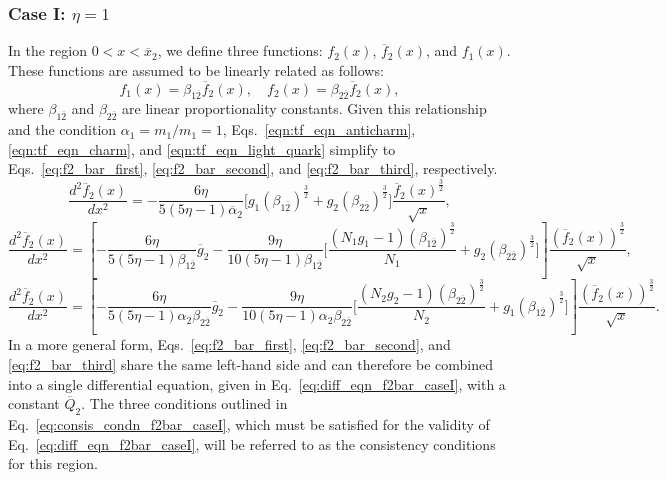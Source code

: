 \documentclass[fleqn]{article}
\begin{document}
        \subsubsection{Case I: $\eta =1$}        
            In the region $0 < x < \overline{x}_{2}$, we define three functions: $f_2(x)$, $\overline{f}_{2}(x)$, and $f_1(x)$. These functions are assumed to be linearly related as follows:  
            \[
            f_1(x) = \beta_{1\overline{2}} \overline{f}_{2}(x), \quad f_2(x) = \beta_{2\overline{2}} \overline{f}_{2}(x),
            \]
            where $\beta_{1\overline{2}}$ and $\beta_{2\overline{2}}$ are linear proportionality constants. 
            Given this relationship and the condition $\alpha_1 = m_{1}/m_{1} = 1$, Eqs.~\eqref{eqn:tf_eqn_anticharm}, \eqref{eqn:tf_eqn_charm}, and \eqref{eqn:tf_eqn_light_quark} simplify to Eqs.~\eqref{eq:f2_bar_first}, \eqref{eq:f2_bar_second}, and \eqref{eq:f2_bar_third}, respectively.
            \begin{equation}
                   \frac{d^2\overline{f}_{2}(x)}{dx^2} = -\frac{6\eta}{5(5\eta-1) \overline{\alpha}_2} \biggl[ g_1 (\beta_{1\overline{2}})^\frac{3}{2} + g_2 (\beta_{2\overline{2}})^\frac{3}{2}
                    \biggr]\frac{\overline{f}_{2}(x)^\frac{3}{2}}{\sqrt{x}},
                    \label{eq:f2_bar_first}
            \end{equation}
            \begin{equation}
                  \frac{d^2 \overline{f}_{2}(x)}{dx^2}= \left[- \frac{6 \eta}{5 (5 \eta -1) \beta_{1\overline{2}}}\overline{g}_{2} -\frac{9\eta}{10(5\eta-1)\beta_{1\overline{2}}}\biggl[\frac{(N_1 g_1-1)(\beta_{1\overline{2}})^\frac{3}{2}}{N_1}
                 + g_2 (\beta_{2\overline{2}})^\frac{3}{2} \biggr]\right]\frac{\left( \overline{f}_2(x)\right)^\frac{3}{2}}{\sqrt{x}},
                 \label{eq:f2_bar_second}
            \end{equation}
            \begin{equation}
                  \frac{d^2 \overline{f}_{2}(x)}{dx^2}= \left[-\frac{6\eta}{5(5\eta-1) \alpha_2 \beta_{2\overline{2}}}    \overline{g}_{2} - \frac{9\eta}{10(5\eta-1) \alpha_2 \beta_{2\overline{2}}}\biggl[\frac{(N_2 g_2-1)(\beta_{2\overline{2}})^\frac{3}{2}}{N_2}      + g_1 (\beta_{1\overline{2}})^\frac{3}{2}\biggr]\right]\frac{\left( \overline{f}_{2}(x) \right)^\frac{3}{2}}{\sqrt{x}}.
                \label{eq:f2_bar_third}
            \end{equation}
            In a more general form, Eqs.~\eqref{eq:f2_bar_first}, \eqref{eq:f2_bar_second}, and \eqref{eq:f2_bar_third} share the same left-hand side and can therefore be combined into a single differential equation, given in Eq.~\eqref{eq:diff_eqn_f2bar_caseI}, with a constant $\overline{Q}_{2}$. The three conditions outlined in Eq.~\eqref{eq:consis_condn_f2bar_caseI}, which must be satisfied for the validity of Eq.~\eqref{eq:diff_eqn_f2bar_caseI}, will be referred to as the consistency conditions for this region.
\end{document}
